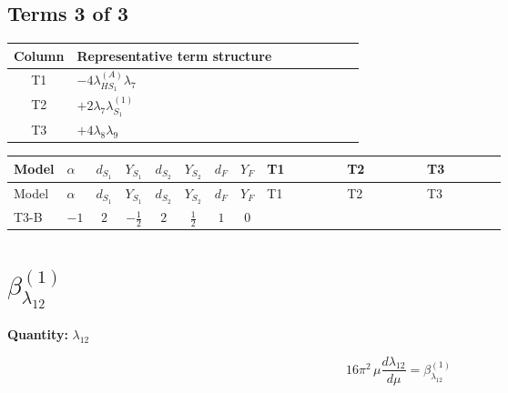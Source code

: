 \documentclass[8pt]{article}
\begin{document}
\begin{landscape}
\subsection*{Terms 3 of 3}
\begin{center}
\begin{tabular}{@{}c >{\raggedright\arraybackslash}p{0.82\linewidth}@{}}
\toprule
Column & Representative term structure \\
\midrule
T1 & \(\displaystyle -4 {\lambda_{HS_1}^{(A)}} {\lambda_{7}}\) \\
\midrule
T2 & \(\displaystyle +2 {\lambda_{7}} {\lambda_{S_1}^{(1)}}\) \\
\midrule
T3 & \(\displaystyle +4 {\lambda_{8}} {\lambda_{9}}\) \\
\midrule
\bottomrule
\end{tabular}
\end{center}
\smallskip
\tiny
\begin{longtable}{@{}llcccccc >{\raggedright\arraybackslash}p{0.21\linewidth} >{\raggedright\arraybackslash}p{0.21\linewidth} >{\raggedright\arraybackslash}p{0.21\linewidth}@{}}
\toprule
Model & $\alpha$ & $d_{S_1}$ & $Y_{S_1}$ & $d_{S_2}$ & $Y_{S_2}$ & $d_F$ & $Y_F$ & T1 & T2 & T3 \\
\midrule
\endfirsthead
\toprule
Model & $\alpha$ & $d_{S_1}$ & $Y_{S_1}$ & $d_{S_2}$ & $Y_{S_2}$ & $d_F$ & $Y_F$ & T1 & T2 & T3 \\
\midrule
\endhead
T3-B & $-1$ & $2$ & $-\frac{1}{2}$ & $2$ & $\frac{1}{2}$ & $1$ & $0$ & \scriptsize\adjustbox{max width=\linewidth}{$\begin{gathered} -4 {\lambda_{HS_1}^{(A)}} {\lambda_{7}}\end{gathered}$} & \scriptsize\adjustbox{max width=\linewidth}{$\begin{gathered} +2 {\lambda_{7}} {\lambda_{S_1}^{(1)}}\end{gathered}$} & \scriptsize\adjustbox{max width=\linewidth}{$\begin{gathered} +4 {\lambda_{8}} {\lambda_{9}}\end{gathered}$} \\
\midrule
\bottomrule
\end{longtable}
\clearpage
\section*{$\beta_{\lambda_{12}}^{(1)}$}
\noindent\textbf{Quantity: }$\lambda_{12}$\par\smallskip
\[16\pi^2\,\mu\frac{d \lambda_{12}}{d\mu}=\beta_{\lambda_{12}}^{(1)}\]

\end{landscape}
\end{document}
